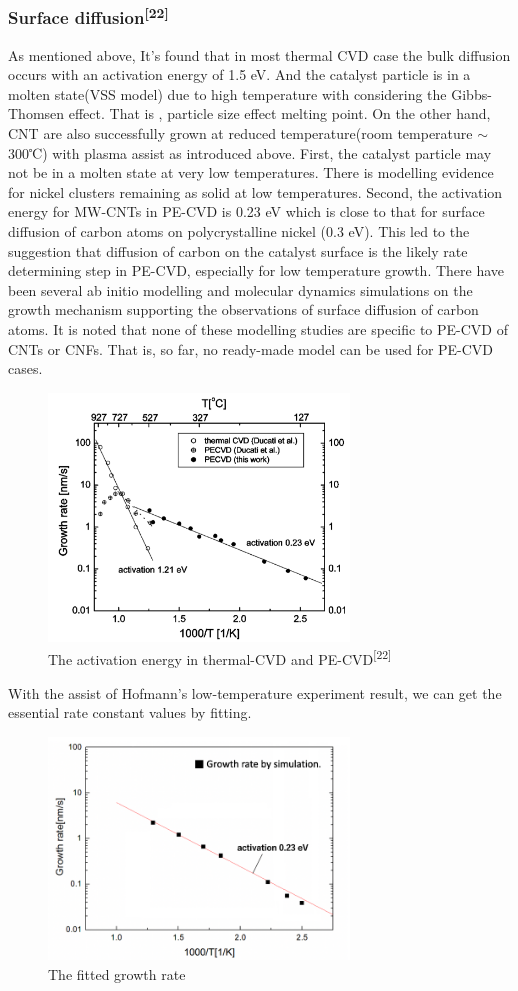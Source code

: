 \subsubsection{Surface diffusion\textsuperscript{[22]}}
As mentioned above, It’s found that in most thermal CVD case the bulk diffusion occurs with an activation energy of 1.5 eV. And  the catalyst particle is in a molten state(VSS model) due to high temperature with considering the Gibbs-Thomsen effect. That is , particle size effect melting point. On the other hand,  CNT are also successfully grown at reduced temperature(room temperature $\sim$ 300℃) with plasma assist as introduced above. First, the catalyst particle may not be in a molten state at very low temperatures. There is modelling evidence for nickel clusters remaining as solid at low temperatures. Second, the activation energy for MW-CNTs in PE-CVD  is 0.23 eV which is close to that for surface diffusion of carbon atoms on polycrystalline nickel (0.3 eV). This led to the suggestion that diffusion of carbon on the catalyst surface is the likely rate determining step in PE-CVD, especially for low temperature growth. There have been several ab initio modelling and molecular dynamics simulations on the growth mechanism supporting the observations of surface diffusion of carbon atoms. It is noted that none of these modelling studies are specific to PE-CVD of CNTs or CNFs. That is, so far, no ready-made model can be used for PE-CVD cases.  
\begin{figure}[H]
\centering
\includegraphics[width=8cm]{src/fig/fig38.png}
\caption{The activation energy in thermal-CVD and PE-CVD\textsuperscript{[22]}}
\end{figure}
With the assist of Hofmann’s low-temperature experiment result, we can get the essential rate constant values by fitting. 
\begin{figure}[H]
\centering
\includegraphics[width=8cm]{src/fig/fig39.png}
\caption{The fitted growth rate}
\end{figure}
